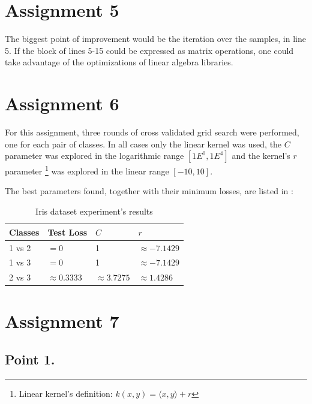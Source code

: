 \documentclass[a4paper,11pt]{article}
\begin{document}
\section*{Assignment 5}

The biggest point of improvement would be the iteration over the samples, in line 5.
If the block of lines 5-15 could be expressed as matrix operations, one could take advantage of the optimizations of linear algebra libraries.

\section*{Assignment 6}

For this assignment, three rounds of cross validated grid search were performed, one for each pair of classes.
In all cases only the linear kernel was used, the $C$ parameter was explored in the logarithmic range $[1E^0, 1E^4]$ and
the kernel's $r$ parameter \footnote{Linear kernel's definition: $k(x, y) = \langle x, y \rangle + r$} was explored in the linear range $[-10, 10]$.

The best parameters found, together with their minimum losses, are listed in :

\begin{table}
    \centering
    \begin{tabular*}{0.61\textwidth}{|l|l|l|l|}
        \hline
        Classes & Test Loss        & $C$ & $r$ \\
        \hline
        1 vs 2  & $= 0$            & 1                  & $\approx -7.1429$   \\
        1 vs 3  & $= 0$            & 1                  & $\approx -7.1429$   \\
        2 vs 3  & $\approx 0.3333$ & $\approx 3.7275$   & $\approx 1.4286$   \\
        \hline
    \end{tabular*}
    \caption{Iris dataset experiment's results}
    \label{tab:table1}
\end{table}

\section*{Assignment 7}

\subsection*{Point 1.}
\end{document}
